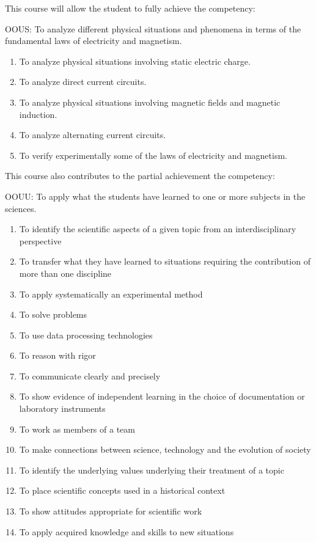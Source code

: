 {This course will allow the student to fully achieve the competency:

OOUS: To analyze different physical situations and phenomena in terms of the fundamental laws of electricity and magnetism.
\begin{enumerate}
\item To analyze physical situations involving static electric charge.
\item To analyze direct current circuits.
\item To analyze physical situations involving magnetic fields and magnetic induction.
\item To analyze alternating current circuits.
\item To verify experimentally some of the laws of electricity and magnetism.
\end{enumerate}
\smallskip
This course also contributes to the partial achievement the competency:

OOUU:	To apply what the students have learned to one or more subjects in the sciences.
\begin{enumerate}
\item To identify the scientific aspects of a given topic from an interdisciplinary perspective
\item To transfer what they have learned to situations requiring the contribution of more than one discipline
\item To apply systematically an experimental method
\item To solve problems
\item To use data processing technologies	
\item To reason with rigor
\item To communicate clearly and precisely
\item To show evidence of independent learning in the choice of documentation or laboratory instruments
\item To work as members of a team
\item To make connections between science, technology and the evolution of society
\item To identify the underlying values underlying their treatment of a topic
\item To place scientific concepts used in a historical context
\item To show attitudes appropriate for scientific work 
\item To apply acquired knowledge and skills to new situations
\end{enumerate}
}